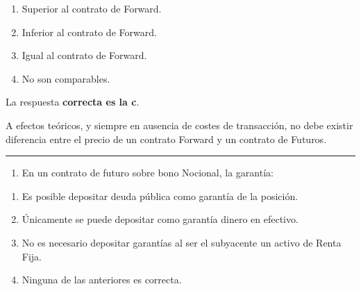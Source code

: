 \documentclass[
  letterpaper,
  DIV=11,
  numbers=noendperiod]{scrreprt}
\providecommand{\tightlist}{%
  \setlength{\itemsep}{0pt}\setlength{\parskip}{0pt}}\usepackage{longtable,booktabs,array}
\begin{document}
\begin{enumerate}
\def\labelenumi{\alph{enumi})}
\item
  Superior al contrato de Forward.
\item
  Inferior al contrato de Forward.
\item
  Igual al contrato de Forward.
\item
  No son comparables.
\end{enumerate}

\begin{tcolorbox}[enhanced jigsaw, left=2mm, opacityback=0, colback=white, breakable, arc=.35mm, bottomrule=.15mm, rightrule=.15mm, toprule=.15mm, leftrule=.75mm, colframe=quarto-callout-tip-color-frame]
\begin{minipage}[t]{5.5mm}
\textcolor{quarto-callout-tip-color}{\faLightbulb}
\end{minipage}%
\begin{minipage}[t]{\textwidth - 5.5mm}

La respuesta \textbf{correcta es la c}.

A efectos teóricos, y siempre en ausencia de costes de transacción, no
debe existir diferencia entre el precio de un contrato Forward y un
contrato de Futuros.

\end{minipage}%
\end{tcolorbox}

\begin{center}\rule{0.5\linewidth}{0.5pt}\end{center}

\begin{enumerate}
\def\labelenumi{\arabic{enumi}.}
\setcounter{enumi}{2}
\tightlist
\item
  En un contrato de futuro sobre bono Nocional, la garantía:
\end{enumerate}

\begin{enumerate}
\def\labelenumi{\alph{enumi})}
\item
  Es posible depositar deuda pública como garantía de la posición.
\item
  Únicamente se puede depositar como garantía dinero en efectivo.
\item
  No es necesario depositar garantías al ser el subyacente un activo de
  Renta Fija.
\item
  Ninguna de las anteriores es correcta.
\end{enumerate}
\end{document}
